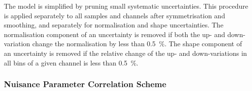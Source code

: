 

The model is simplified by pruning small systematic uncertainties. This
procedure is applied separately to all samples and channels after symmetrisation
and smoothing, and separately for normalisation and shape uncertainties. The
normalisation component of an uncertainty is removed if both the up- and
down-variation change the normalisation by less than \SI{0.5}{\percent}. The
shape component of an uncertainty is removed if the relative change of the up-
and down-variations in all bins of a given channel is less than
\SI{0.5}{\percent}.


\subsubsection{Nuisance Parameter Correlation Scheme}

